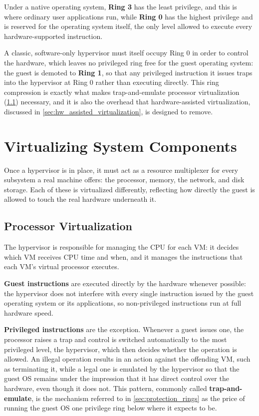 \begin{warningblock}
    Under a native operating system, \textbf{Ring 3} has the least privilege, and this is where ordinary user applications run, while \textbf{Ring 0} has the highest privilege and is reserved for the operating system itself, the only level allowed to execute every hardware-supported instruction.

    A classic, software-only hypervisor must itself occupy Ring 0 in order to control the hardware, which leaves no privileged ring free for the guest operating system: the guest is demoted to \textbf{Ring 1}, so that any privileged instruction it issues traps into the hypervisor at Ring 0 rather than executing directly. This ring compression is exactly what makes trap-and-emulate processor virtualization (\cref{sec:cpu_virtualization}) necessary, and it is also the overhead that hardware-assisted virtualization, discussed in \cref{sec:hw_assisted_virtualization}, is designed to remove.
\end{warningblock}

\section{Virtualizing System Components} \label{sec:virtualizing_components}

Once a hypervisor is in place, it must act as a resource multiplexer for every subsystem a real machine offers: the processor, memory, the network, and disk storage. Each of these is virtualized differently, reflecting how directly the guest is allowed to touch the real hardware underneath it.

\subsection{Processor Virtualization} \label{sec:cpu_virtualization}

The hypervisor is responsible for managing the CPU for each VM: it decides which VM receives CPU time and when, and it manages the instructions that each VM's virtual processor executes.

\textbf{Guest instructions} are executed directly by the hardware whenever possible: the hypervisor does not interfere with every single instruction issued by the guest operating system or its applications, so non-privileged instructions run at full hardware speed.

\textbf{Privileged instructions} are the exception. Whenever a guest issues one, the processor raises a trap and control is switched automatically to the most privileged level, the hypervisor, which then decides whether the operation is allowed. An illegal operation results in an action against the offending VM, such as terminating it, while a legal one is emulated by the hypervisor so that the guest OS remains under the impression that it has direct control over the hardware, even though it does not. This pattern, commonly called \textbf{trap-and-emulate}, is the mechanism referred to in \cref{sec:protection_rings} as the price of running the guest OS one privilege ring below where it expects to be.

